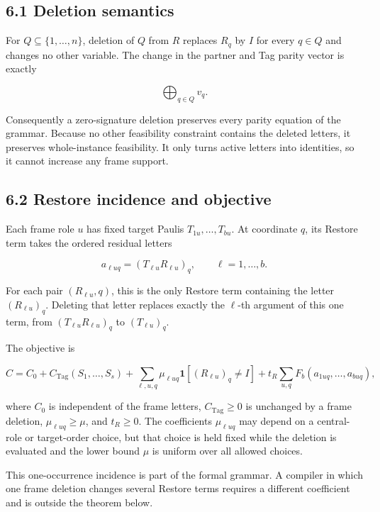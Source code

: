 \documentclass[11pt]{article}
\begin{document}
\subsection*{6.1 Deletion semantics}\label{deletion-semantics}

For \(Q\subseteq\{1,\ldots,n\}\), deletion of \(Q\) from \(R\) replaces \(R_q\) by \(I\) for every \(q\in Q\) and changes no other variable. The change in the partner and Tag parity vector is exactly

\[
\bigoplus_{q\in Q}v_q.
\]

Consequently a zero-signature deletion preserves every parity equation of the grammar. Because no other feasibility constraint contains the deleted letters, it preserves whole-instance feasibility. It only turns active letters into identities, so it cannot increase any frame support.

\subsection*{6.2 Restore incidence and objective}\label{restore-incidence-and-objective}

Each frame role \(u\) has fixed target Paulis \(T_{1u},\ldots,T_{bu}\). At coordinate \(q\), its Restore term takes the ordered residual letters

\[
a_{\ell uq}=(T_{\ell u}R_{\ell u})_q,
\qquad \ell=1,\ldots,b.
\]

For each pair \((R_{\ell u},q)\), this is the only Restore term containing the letter \((R_{\ell u})_q\). Deleting that letter replaces exactly the \(\ell\)-th argument of this one term, from \((T_{\ell u}R_{\ell u})_q\) to \((T_{\ell u})_q\).

The objective is

\[
C=C_0+C_{\mathrm{Tag}}(S_1,\ldots,S_s)
+\sum_{\ell,u,q}\mu_{\ell uq}\mathbf{1}[(R_{\ell u})_q\neq I]
+t_R\sum_{u,q}F_b(a_{1uq},\ldots,a_{buq}),
\]

where \(C_0\) is independent of the frame letters, \(C_{\mathrm{Tag}}\geq0\) is unchanged by a frame deletion, \(\mu_{\ell uq}\geq\mu\), and \(t_R\geq0\). The coefficients \(\mu_{\ell uq}\) may depend on a central-role or target-order choice, but that choice is held fixed while the deletion is evaluated and the lower bound \(\mu\) is uniform over all allowed choices.

This one-occurrence incidence is part of the formal grammar. A compiler in which one frame deletion changes several Restore terms requires a different coefficient and is outside the theorem below.
\end{document}
